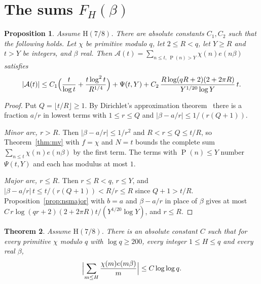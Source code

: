 \documentclass[11pt]{amsart}
\newtheorem{theorem}{Theorem}
\newtheorem{proposition}[theorem]{Proposition}
\theoremstyle{definition}
\theoremstyle{remark}
\numberwithin{equation}{section}
\newcommand{\e}{e}
\DeclareMathOperator{\gpf}{P}
\begin{document}
\section{The sums $F_H(\beta)$}\label{sec:B}

\begin{proposition}\label{prop:partial}
Assume $\mathrm H(7/8)$. There are absolute constants $C_1,C_2$ such that the
following holds. Let $\chi$ be primitive modulo $q$, let $2\le R<q$, let $Y\ge R$ and
$t>Y$ be integers, and $\beta$ real. Then $\mathcal A(t)=\sum_{n\le t,\
\gpf(n)>Y}\chi(n)\e(n\beta)$ satisfies
\[
|\mathcal A(t)|\le C_1\Bigl(\frac t{\log t}+\frac{t\log^2t}{R^{1/4}}\Bigr)+\Psi(t,Y)+C_2\,\frac{R\log(qR+2)(2+2\pi
R)}{Y^{1/20}\log Y}\,t .
\]
\end{proposition}

\begin{proof}
Put $Q=\lfloor t/R\rfloor\ge1$. By Dirichlet's approximation
theorem~\cite[Theorem~185]{hw08} there is a fraction $a/r$ in lowest terms with
$1\le r\le Q$ and $|\beta-a/r|\le1/(r(Q+1))$.

\emph{Minor arc, $r>R$.} Then $|\beta-a/r|\le1/r^2$ and $R<r\le Q\le t/R$, so
Theorem~\ref{thm:mv} with $f=\chi$ and $N=t$ bounds the complete sum
$\sum_{n\le t}\chi(n)\e(n\beta)$ by the first term. The terms with $\gpf(n)\le Y$
number $\Psi(t,Y)$ and each has modulus at most $1$.

\emph{Major arc, $r\le R$.} Then $r\le R<q$, $r\le Y$, and
$|\beta-a/r|\,t\le t/(r(Q+1))<R/r\le R$ since $Q+1>t/R$.
Proposition~\ref{prop:nsmajor} with $b=a$ and $\beta-a/r$ in place of $\beta$
gives at most
$C\,r\log(qr+2)(2+2\pi R)t/(Y^{1/20}\log Y)$, and $r\le R$.
\end{proof}

\begin{theorem}\label{thm:B}
Assume $\mathrm H(7/8)$. There is an absolute constant $C$ such that for every
primitive $\chi$ modulo $q$ with $\log q\ge200$, every integer $1\le H\le q$ and
every real $\beta$,
\[
\Bigl|\sum_{m\le H}\frac{\chi(m)\e(m\beta)}m\Bigr|\le C\log\log q .
\]
\end{theorem}
\end{document}
